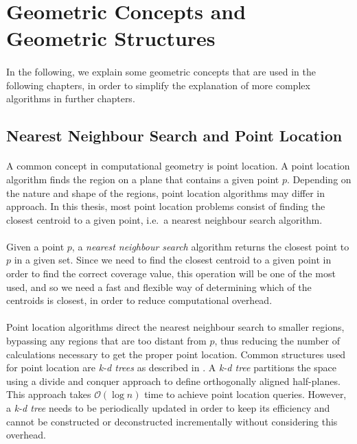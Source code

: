 \section{Geometric Concepts and Geometric Structures}
\paragraph{}
In the following, we explain some geometric concepts that are used in the following chapters, in order to simplify the explanation of more complex algorithms in further chapters.
\subsection{Nearest Neighbour Search and Point Location}
\paragraph{}
A common concept in computational geometry is point location. A point location algorithm finds the region on a plane that contains a given point $p$. Depending on the nature and shape of the regions, point location algorithms may differ in approach. In this thesis, most point location problems consist of finding the closest centroid to a given point, i.e.\ a nearest neighbour search algorithm.

\paragraph{}
Given a point $p$, a \emph{nearest neighbour search} algorithm returns the closest point to $p$ in a given set. Since we need to find the closest centroid to a given point in order to find the correct coverage value, this operation will be one of the most used, and  so we need a fast and flexible way of determining which of the centroids is closest, in order to reduce computational overhead. 

\paragraph{}
Point location algorithms direct the nearest neighbour search to smaller regions, bypassing any regions that are too distant from $p$, thus reducing the number of calculations necessary to get the proper point location.
Common structures used for point location are \emph{k-d trees} as described in \citet{incrementalcov}. A \emph{k-d tree} partitions the space using a divide and conquer approach to define orthogonally aligned half-planes. This approach takes $\mathcal{O}(\log{n})$ time to achieve point location queries. However, a \emph{k-d tree} needs to be periodically updated in order to keep its efficiency and cannot be constructed or deconstructed incrementally without considering this overhead.
